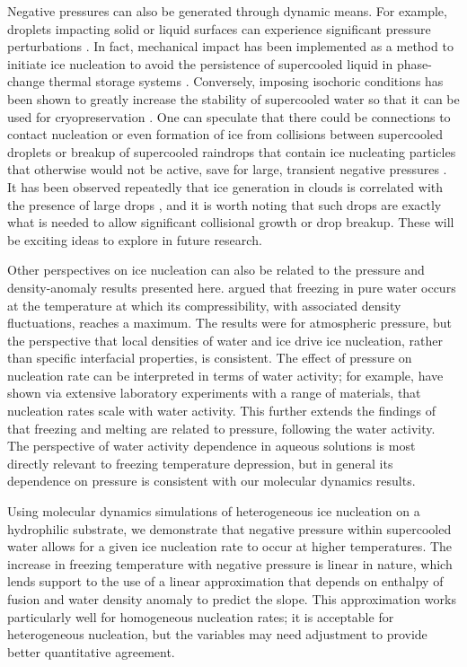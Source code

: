 \documentclass[journal abbreviation, manuscript]{copernicus}
\providecommand{\DIFadd}[1]{{\protect\color{blue}\uwave{#1}}} %
\providecommand{\DIFaddbegin}{} %
\providecommand{\DIFaddend}{} %
\begin{document}
Negative pressures can also be generated through dynamic means. For example, droplets impacting solid or liquid surfaces can experience significant pressure perturbations \citep{cheng2022drop}. In fact, mechanical impact has been implemented as a method to initiate ice nucleation to avoid the persistence of supercooled liquid in phase-change thermal storage systems \citep{wang2022nucleation}. Conversely, imposing isochoric conditions has been shown to greatly increase the stability of supercooled water so that it can be used for cryopreservation \citep{powell2020isochoric}. One can speculate that there could be connections to contact nucleation or even formation of ice from collisions between supercooled droplets \citep{alkezweeny1969freezing} or breakup of supercooled raindrops that contain ice nucleating particles that otherwise would not be active, save for large, transient negative pressures \DIFaddbegin \DIFadd{\mbox{%
\citep{james2021impact}}\hspace{0pt}%
}\DIFaddend . It has been observed repeatedly that ice generation in clouds is correlated with the presence of large drops \citep{rangno1991ice,lance2011cloud}, and it is worth noting that such drops are exactly what is needed to allow significant collisional growth or drop breakup. These will be exciting ideas to explore in future research.

Other perspectives on ice nucleation can also be related to the pressure and density-anomaly results presented here. \citet{baker2004new} argued that freezing in pure water occurs at the temperature at which its compressibility, with associated density fluctuations, reaches a maximum. The results were for atmospheric pressure, but the perspective that local densities of water and ice drive ice nucleation, rather than specific interfacial properties, is consistent. The effect of pressure on nucleation rate can be interpreted in terms of water activity; for example, \citep{knopf2013water} have shown via extensive laboratory experiments with a range of materials, that nucleation rates scale with water activity. This further extends the findings of \citet{koop2000water} that freezing and melting are related to pressure, following the water activity. The perspective of water activity dependence in aqueous solutions is most directly relevant to freezing temperature depression, but in general its dependence on pressure is consistent with our molecular dynamics results. 


Using molecular dynamics simulations of heterogeneous ice nucleation on a hydrophilic substrate, we demonstrate that negative pressure within supercooled water allows for a given ice nucleation rate to occur at higher temperatures. The increase in freezing temperature with negative pressure is linear in nature, which lends support to the use of a linear approximation that depends on enthalpy of fusion and water density anomaly to predict the slope.  This approximation works particularly well for homogeneous nucleation rates; it is acceptable for heterogeneous nucleation, but the variables may need adjustment to provide better quantitative agreement. 
\end{document}
